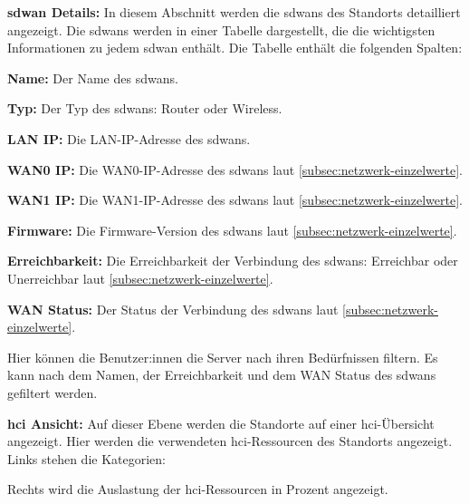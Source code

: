 \begin{compactitem}
\begin{compactitem}
\begin{compactitem}
\begin{compactitem}
                \item \textbf{\gls{sdwan} Details:} In diesem Abschnitt werden die \gls{sdwan}s des Standorts detailliert angezeigt.
                Die \gls{sdwan}s werden in einer Tabelle dargestellt, die die wichtigsten Informationen zu jedem \gls{sdwan} enthält.
                Die Tabelle enthält die folgenden Spalten:
                \begin{compactitem}
                    \item \textbf{Name:} Der Name des \gls{sdwan}s.
                    \item \textbf{Typ:} Der Typ des \gls{sdwan}s: Router oder Wireless.
                    \item \textbf{LAN IP:} Die LAN-IP-Adresse des \gls{sdwan}s.
                    \item \textbf{WAN0 IP:} Die WAN0-IP-Adresse des \gls{sdwan}s laut \ref{subsec:netzwerk-einzelwerte}.
                    \item \textbf{WAN1 IP:} Die WAN1-IP-Adresse des \gls{sdwan}s laut \ref{subsec:netzwerk-einzelwerte}.
                    \item \textbf{Firmware:} Die Firmware-Version des \gls{sdwan}s laut \ref{subsec:netzwerk-einzelwerte}.
                    \item \textbf{Erreichbarkeit:} Die Erreichbarkeit der Verbindung des \gls{sdwan}s: Erreichbar oder Unerreichbar laut \ref{subsec:netzwerk-einzelwerte}.
                    \item \textbf{WAN Status:} Der Status der Verbindung des \gls{sdwan}s laut \ref{subsec:netzwerk-einzelwerte}.
                \end{compactitem}

                Hier können die Benutzer:innen die Server nach ihren Bedürfnissen filtern.
                Es kann nach dem Namen, der Erreichbarkeit und dem WAN Status des \gls{sdwan}s gefiltert werden.
            \end{compactitem}
            
            \item \textbf{\gls{hci} Ansicht:} Auf dieser Ebene werden die Standorte auf einer \gls{hci}-Übersicht angezeigt.
            Hier werden die verwendeten \gls{hci}-Ressourcen des Standorts angezeigt.
            Links stehen die Kategorien: 

            Rechts wird die Auslastung der \gls{hci}-Ressourcen in Prozent angezeigt.


\end{compactitem}
\end{compactitem}
\end{compactitem}
